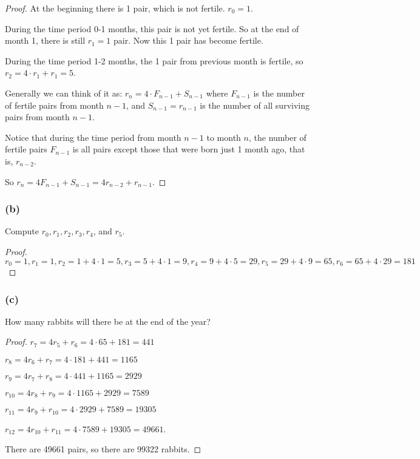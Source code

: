 \documentclass[14pt]{extarticle}
\begin{document}
\begin{proof}
    At the beginning there is 1 pair, which is not fertile. $r_0 = 1$.

    During the time period 0-1 months, this pair is not yet fertile. So at the end of month 1, there is still $r_1 = 1$
    pair. Now this 1 pair has become fertile.

    During the time period 1-2 months, the 1 pair from previous month is fertile, so $r_2 = 4 \cdot r_1 + r_1 = 5$.

    Generally we can think of it as: $r_n = 4 \cdot F_{n-1} + S_{n-1}$ where $F_{n-1}$ is the number of fertile pairs
    from month $n-1$, and $S_{n-1} = r_{n-1}$ is the number of all surviving pairs from month $n-1$.

    Notice that during the time period from month $n-1$ to month $n$, the number of fertile pairs $F_{n-1}$ is all
    pairs except those that were born just 1 month ago, that is, $r_{n-2}$.

    So $r_n = 4F_{n-1} + S_{n-1} = 4r_{n-2} + r_{n-1}$.
\end{proof}

\subsubsection{(b)}
Compute $r_0, r_1, r_2, r_3, r_4$, and $r_5$.

\begin{proof}
    $r_0 = 1, r_1 = 1, r_2 = 1 + 4\cdot1 = 5, r_3 = 5 + 4\cdot1 = 9, r_4 = 9 + 4\cdot5 = 29, r_5 = 29 + 4\cdot9 = 65,
        r_6 = 65 + 4\cdot29 = 181$
\end{proof}

\subsubsection{(c)}
How many rabbits will there be at the end of the year?

\begin{proof}
    $r_7 = 4r_5 + r_6 = 4 \cdot 65 + 181 = 441$

    $r_8 = 4r_6 + r_7 = 4 \cdot 181 + 441 = 1165$

    $r_9 = 4r_7 + r_8 = 4 \cdot 441 + 1165 = 2929$

    $r_{10} = 4r_8 + r_9 = 4 \cdot 1165 + 2929 = 7589$

    $r_{11} = 4r_9 + r_{10} = 4 \cdot 2929 + 7589 = 19305$

    $r_{12} = 4r_{10} + r_{11} = 4 \cdot 7589 + 19305 = 49661$.

    There are 49661 pairs, so there are 99322 rabbits.
\end{proof}
\end{document}
